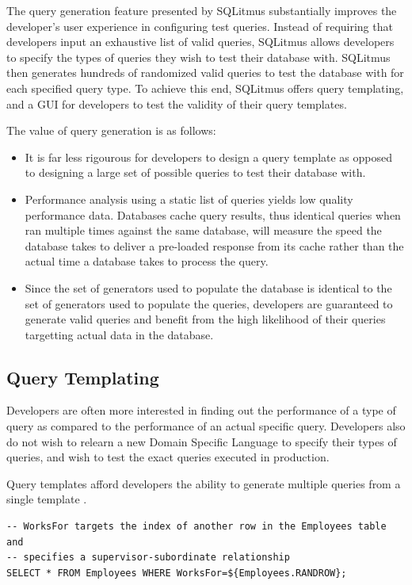 \documentclass[12pt]{report}
\begin{document}
\begin{spacing}{1.9}
		The query generation feature presented by SQLitmus substantially improves the developer's user experience in configuring test queries. Instead of requiring that developers input an exhaustive list of valid queries, SQLitmus allows developers to specify the types of queries they wish to test their database with. SQLitmus then generates hundreds of randomized valid queries to test the database with for each specified query type. To achieve this end, SQLitmus offers query templating, and a GUI for developers to test the validity of their query templates.
		
		The value of query generation is as follows:
		\begin{itemize}
			\item It is far less rigourous for developers to design a query template as opposed to designing a large set of possible queries to test their database with.
			\item Performance analysis using a static list of queries yields low quality performance data. Databases cache query results, thus identical queries when ran multiple times against the same database, will measure the speed the database takes to deliver a pre-loaded response from its cache rather than the actual time a database takes to process the query.
			\item Since the set of generators used to populate the database is identical to the set of generators used to populate the queries, developers are guaranteed to generate valid queries and benefit from the high likelihood of their queries targetting actual data in the database.
		\end{itemize}
		
		\subsection{Query Templating}
		
		Developers are often more interested in finding out the performance of a type of query as compared to the performance of an actual specific query. Developers also do not wish to relearn a new Domain Specific Language to specify their types of queries, and wish to test the exact queries executed in production.
		
		Query templates afford developers the ability to generate multiple queries from a single template . 
		
		
		
		\begin{verbatim}
-- WorksFor targets the index of another row in the Employees table and
-- specifies a supervisor-subordinate relationship
SELECT * FROM Employees WHERE WorksFor=${Employees.RANDROW};
		\end{verbatim}
		

\end{spacing}
\end{document}
